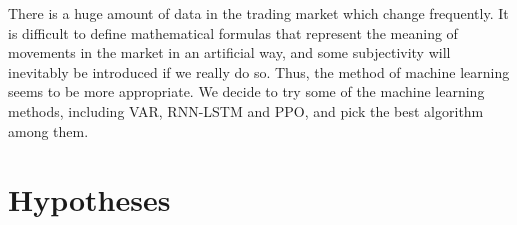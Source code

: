 \documentclass{mcmthesis}
\begin{document}
There is a huge amount of data in the trading market which change frequently.
It is difficult to define mathematical formulas that represent the meaning of movements in the market in an artificial way, and some subjectivity will inevitably be introduced if we really do so.
Thus, the method of machine learning seems to be more appropriate.
We decide to try some of the machine learning methods, including VAR, RNN-LSTM and PPO, and pick the best algorithm among them.






\section{Hypotheses}
\end{document}
